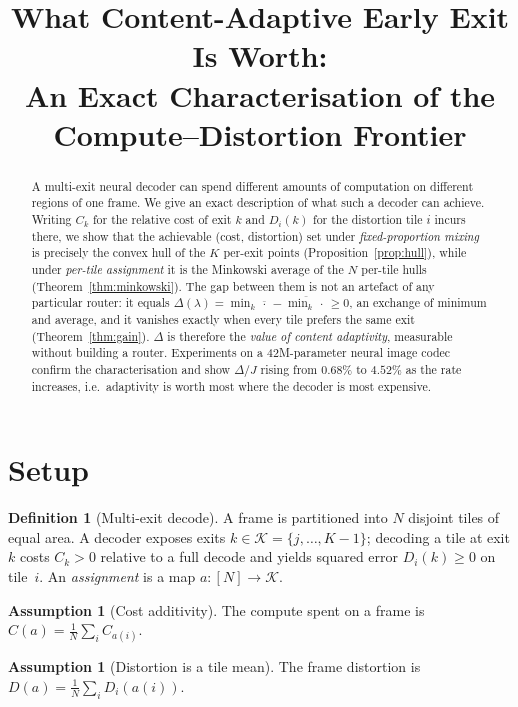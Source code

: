 \documentclass[10pt]{article}
\title{\vspace{-2em}What Content-Adaptive Early Exit Is Worth:\\
An Exact Characterisation of the Compute--Distortion Frontier}
\author{}
\date{}
\theoremstyle{plain}
\theoremstyle{definition}
\newtheorem{definition}[theorem]{Definition}
\newtheorem{assumption}[theorem]{Assumption}
\begin{document}
\maketitle
\vspace{-3em}

\begin{abstract}
\noindent
A multi-exit neural decoder can spend different amounts of computation on
different regions of one frame. We give an exact description of what such a
decoder can achieve. Writing $C_k$ for the relative cost of exit $k$ and
$D_i(k)$ for the distortion tile $i$ incurs there, we show that the achievable
(cost, distortion) set under \emph{fixed-proportion mixing} is precisely the
convex hull of the $K$ per-exit points (Proposition~\ref{prop:hull}), while
under \emph{per-tile assignment} it is the Minkowski average of the $N$
per-tile hulls (Theorem~\ref{thm:minkowski}). The gap between them is not an
artefact of any particular router: it equals
$\Delta(\lambda)=\min_k\overline{\,\cdot\,}-\overline{\min_k\,\cdot\,}\ge 0$,
an exchange of minimum and average, and it vanishes exactly when every tile
prefers the same exit (Theorem~\ref{thm:gain}). $\Delta$ is therefore the
\emph{value of content adaptivity}, measurable without building a router.
Experiments on a 42M-parameter neural image codec confirm the characterisation
and show $\Delta/J$ rising from $0.68\%$ to $4.52\%$ as the rate increases,
i.e.\ adaptivity is worth most where the decoder is most expensive.
\end{abstract}

\section{Setup}

\begin{definition}[Multi-exit decode]\label{def:setup}
A frame is partitioned into $N$ disjoint tiles of equal area. A decoder exposes
exits $k\in\mathcal{K}=\{j,\dots,K-1\}$; decoding a tile at exit $k$ costs
$C_k>0$ relative to a full decode and yields squared error $D_i(k)\ge 0$ on
tile~$i$. An \emph{assignment} is a map $a:[N]\to\mathcal{K}$.
\end{definition}

\begin{assumption}[Cost additivity]\label{as:cost}
The compute spent on a frame is $C(a)=\frac1N\sum_{i} C_{a(i)}$.
\end{assumption}

\begin{assumption}[Distortion is a tile mean]\label{as:dist}
The frame distortion is $D(a)=\frac1N\sum_i D_i(a(i))$.
\end{assumption}
\end{document}
